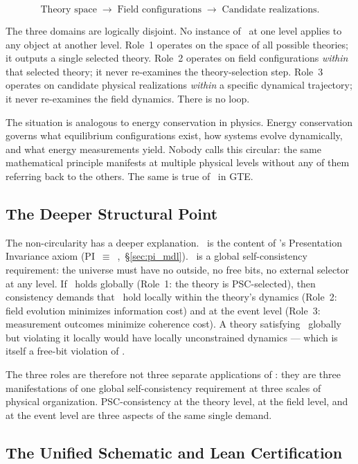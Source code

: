 \documentclass[11pt,openany]{book}
\theoremstyle{remark}
\newcommand{\MDL}{\text{MDL}}
\newcommand{\PSC}{\text{PSC}}
\begin{document}
\[
\text{Theory space} \;\to\; \text{Field configurations} \;\to\; \text{Candidate realizations.}
\]

The three domains are logically disjoint. No instance of \MDL\ at one level applies to
any object at another level. Role~1 operates on the space of all possible theories;
it outputs a single selected theory. Role~2 operates on field configurations
\emph{within} that selected theory; it never re-examines the theory-selection step.
Role~3 operates on candidate physical realizations \emph{within} a specific dynamical
trajectory; it never re-examines the field dynamics. There is no loop.

The situation is analogous to energy conservation in physics. Energy conservation
governs what equilibrium configurations exist, how systems evolve dynamically, and
what energy measurements yield. Nobody calls this circular: the same mathematical
principle manifests at multiple physical levels without any of them referring back to
the others. The same is true of \MDL\ in GTE.

\subsection*{The Deeper Structural Point}

The non-circularity has a deeper explanation. \MDL\ is the content of \PSC's
Presentation Invariance axiom (PI~$\equiv$~\MDL,\ \S\ref{sec:pi_mdl}). \PSC\ is a
global self-consistency requirement: the universe must have no outside, no free bits,
no external selector at any level. If \PSC\ holds globally (Role~1: the theory is
PSC-selected), then consistency demands that \PSC\ hold locally within the theory's
dynamics (Role~2: field evolution minimizes information cost) and at the event level
(Role~3: measurement outcomes minimize coherence cost). A theory satisfying \PSC\
globally but violating it locally would have locally unconstrained dynamics --- which
is itself a free-bit violation of \PSC.

The three roles are therefore not three separate applications of \MDL: they are three
manifestations of one global self-consistency requirement at three scales of physical
organization. PSC-consistency at the theory level, at the field level, and at the
event level are three aspects of the same single demand.

\subsection*{The Unified Schematic and Lean Certification}
\end{document}
